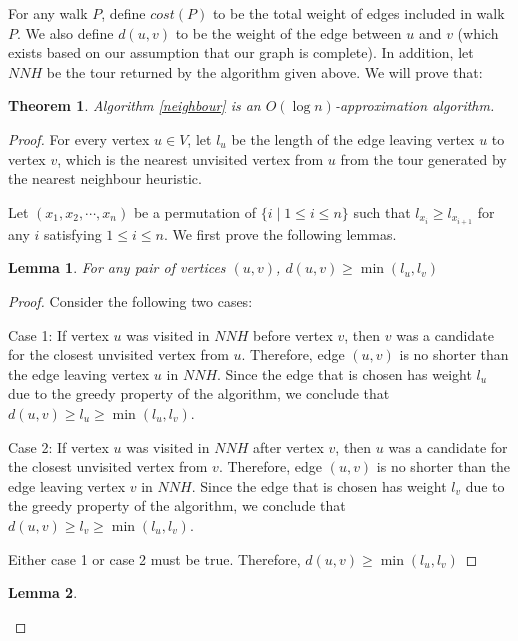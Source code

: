 \documentclass[paper=a4, fontsize=11pt]{scrartcl}	%
\numberwithin{equation}{section}		%
\numberwithin{figure}{section}			%
\numberwithin{table}{section}				%
\newtheorem{theorem}{Theorem}
\newtheorem{lemma}{Lemma}
\begin{document}
For any walk $P$, define $cost(P)$ to be the total weight of edges included in walk $P$. We also define $d(u,v)$ to be the weight of the edge between $u$ and $v$ (which exists based on our assumption that our graph is complete). In addition, let $NNH$ be the tour returned by the algorithm given above. We will prove that:

\begin{theorem}
Algorithm \ref{neighbour} is an $O(\log n)$-approximation algorithm.
\end{theorem}

\begin{proof}
For every vertex $u\in V$, let $l_{u}$ be the length of the edge leaving vertex $u$ to vertex $v$, which is the nearest unvisited vertex from $u$ from the tour generated by the nearest neighbour heuristic.
\item
Let $(x_1, x_2, \cdots, x_n)$ be a permutation of $\{i\mid 1\leq i \leq n\}$ such that $l_{x_i} \geq l_{x_{i+1}}$ for any $i$ satisfying $1\leq i\le n$. We first prove the following lemmas.
\begin{lemma}
For any pair of vertices $(u,v)$, $d(u,v)\geq \min(l_{u},l_{v})$
\end{lemma}
\begin{proof} Consider the following two cases:
\item
Case 1: If vertex $u$ was visited in $NNH$ before vertex $v$, then $v$ was a candidate for the closest unvisited vertex from $u$. Therefore, edge $(u,v)$ is no shorter than the edge leaving vertex $u$ in $NNH$. Since the edge that is chosen has weight $l_{u}$ due to the greedy property of the algorithm, we conclude that $d(u,v)\geq l_{u}\geq \min(l_{u},l_{v})$.
\item
Case 2: If vertex $u$ was visited in $NNH$ after vertex $v$, then $u$ was a candidate for the closest unvisited vertex from $v$. Therefore, edge $(u,v)$ is no shorter than the edge leaving vertex $v$ in $NNH$. Since the edge that is chosen has weight $l_{v}$ due to the greedy property of the algorithm, we conclude that $d(u,v)\geq l_{v}\geq \min(l_{u},l_{v})$.
\item Either case 1 or case 2 must be true. Therefore, $d(u,v)\geq \min(l_{u},l_{v})$
\end{proof}
\begin{lemma}


\end{lemma}
\end{proof}
\end{document}
